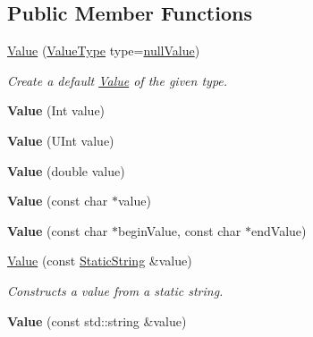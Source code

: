 \subsection*{Public Member Functions}
\begin{DoxyCompactItemize}
\item 
\hyperlink{class_json_1_1_value_a3ce7bec19318bc069f4dbc4e43725bc5}{Value} (\hyperlink{namespace_json_a7d654b75c16a57007925868e38212b4e}{Value\+Type} type=\hyperlink{namespace_json_a7d654b75c16a57007925868e38212b4ea7d9899633b4409bd3fc107e6737f8391}{null\+Value})
\begin{DoxyCompactList}\small\item\em Create a default \hyperlink{class_json_1_1_value}{Value} of the given type. \end{DoxyCompactList}\item 
\hypertarget{class_json_1_1_value_a9c470d229adbc6939789e40f1fbcd1ce}{{\bfseries Value} (Int value)}\label{class_json_1_1_value_a9c470d229adbc6939789e40f1fbcd1ce}

\item 
\hypertarget{class_json_1_1_value_a0ff45efa8987665835902652aa497f97}{{\bfseries Value} (U\+Int value)}\label{class_json_1_1_value_a0ff45efa8987665835902652aa497f97}

\item 
\hypertarget{class_json_1_1_value_a3a8f4510e2ccf164c4d1c9c7897bf71f}{{\bfseries Value} (double value)}\label{class_json_1_1_value_a3a8f4510e2ccf164c4d1c9c7897bf71f}

\item 
\hypertarget{class_json_1_1_value_a615659663ae1bbba6d8d42c667d46a52}{{\bfseries Value} (const char $\ast$value)}\label{class_json_1_1_value_a615659663ae1bbba6d8d42c667d46a52}

\item 
\hypertarget{class_json_1_1_value_a9b7e1880ba8994a9f551a2556a0a8a81}{{\bfseries Value} (const char $\ast$begin\+Value, const char $\ast$end\+Value)}\label{class_json_1_1_value_a9b7e1880ba8994a9f551a2556a0a8a81}

\item 
\hyperlink{class_json_1_1_value_a1171499d752d1aee3507a9be2773456d}{Value} (const \hyperlink{class_json_1_1_static_string}{Static\+String} \&value)
\begin{DoxyCompactList}\small\item\em Constructs a value from a static string. \end{DoxyCompactList}\item 
\hypertarget{class_json_1_1_value_a02ceec0acf91d63b4934c0df8b8ae893}{{\bfseries Value} (const std\+::string \&value)}\label{class_json_1_1_value_a02ceec0acf91d63b4934c0df8b8ae893}


\end{DoxyCompactItemize}
